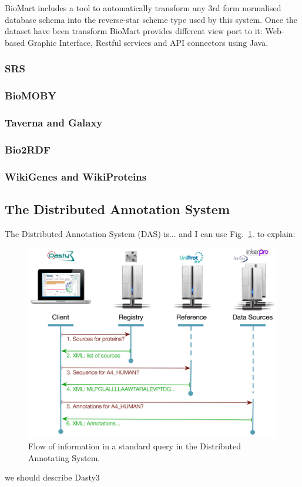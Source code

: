 BioMart includes a tool to automatically transform any 3rd form normalised database schema into the reverse-star scheme type used by this system. Once the dataset have been transform BioMart provides different view port to it: Web-based Graphic Interface, Restful services and API connectors using Java.


\subsubsection{SRS}
\subsubsection{BioMOBY}
\subsubsection{Taverna and Galaxy}
\subsubsection{Bio2RDF}
\subsubsection{WikiGenes and WikiProteins}

\subsection{The Distributed Annotation System}
The Distributed Annotation System (DAS) is... \cite{JEN2008} and I can use Fig.~\ref{fig:das}. to explain:
\begin{figure}  
\includegraphics[width=\textwidth]{figures/DAS.png}
\caption[DAS Flow of Information.]{Flow of information in a standard query in the Distributed Annotating System.
\label{fig:das}}
\end{figure}
we should describe Dasty3 \cite{VIL2011}

